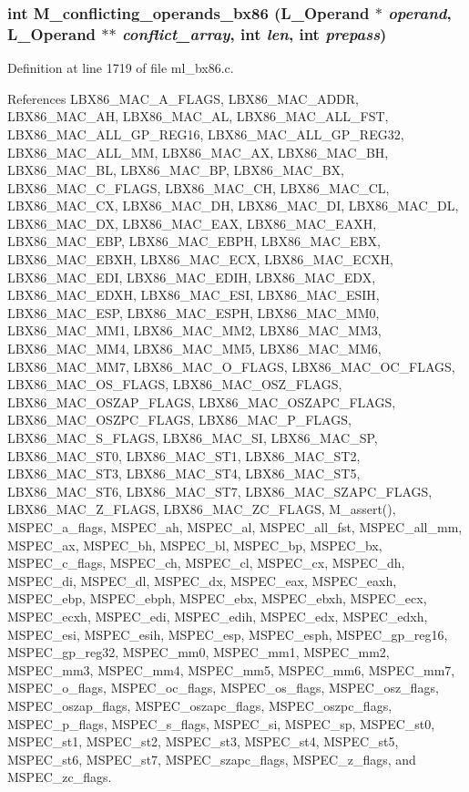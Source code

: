 \subsubsection{\setlength{\rightskip}{0pt plus 5cm}int M\_\-conflicting\_\-operands\_\-bx86 (L\_\-Operand $\ast$ {\em operand}, L\_\-Operand $\ast$$\ast$ {\em conflict\_\-array}, int {\em len}, int {\em prepass})}\label{m__bx86_8h_4954ea2e9fd4bad8ff3bb50174c9fd7f}




Definition at line 1719 of file ml\_\-bx86.c.

References LBX86\_\-MAC\_\-A\_\-FLAGS, LBX86\_\-MAC\_\-ADDR, LBX86\_\-MAC\_\-AH, LBX86\_\-MAC\_\-AL, LBX86\_\-MAC\_\-ALL\_\-FST, LBX86\_\-MAC\_\-ALL\_\-GP\_\-REG16, LBX86\_\-MAC\_\-ALL\_\-GP\_\-REG32, LBX86\_\-MAC\_\-ALL\_\-MM, LBX86\_\-MAC\_\-AX, LBX86\_\-MAC\_\-BH, LBX86\_\-MAC\_\-BL, LBX86\_\-MAC\_\-BP, LBX86\_\-MAC\_\-BX, LBX86\_\-MAC\_\-C\_\-FLAGS, LBX86\_\-MAC\_\-CH, LBX86\_\-MAC\_\-CL, LBX86\_\-MAC\_\-CX, LBX86\_\-MAC\_\-DH, LBX86\_\-MAC\_\-DI, LBX86\_\-MAC\_\-DL, LBX86\_\-MAC\_\-DX, LBX86\_\-MAC\_\-EAX, LBX86\_\-MAC\_\-EAXH, LBX86\_\-MAC\_\-EBP, LBX86\_\-MAC\_\-EBPH, LBX86\_\-MAC\_\-EBX, LBX86\_\-MAC\_\-EBXH, LBX86\_\-MAC\_\-ECX, LBX86\_\-MAC\_\-ECXH, LBX86\_\-MAC\_\-EDI, LBX86\_\-MAC\_\-EDIH, LBX86\_\-MAC\_\-EDX, LBX86\_\-MAC\_\-EDXH, LBX86\_\-MAC\_\-ESI, LBX86\_\-MAC\_\-ESIH, LBX86\_\-MAC\_\-ESP, LBX86\_\-MAC\_\-ESPH, LBX86\_\-MAC\_\-MM0, LBX86\_\-MAC\_\-MM1, LBX86\_\-MAC\_\-MM2, LBX86\_\-MAC\_\-MM3, LBX86\_\-MAC\_\-MM4, LBX86\_\-MAC\_\-MM5, LBX86\_\-MAC\_\-MM6, LBX86\_\-MAC\_\-MM7, LBX86\_\-MAC\_\-O\_\-FLAGS, LBX86\_\-MAC\_\-OC\_\-FLAGS, LBX86\_\-MAC\_\-OS\_\-FLAGS, LBX86\_\-MAC\_\-OSZ\_\-FLAGS, LBX86\_\-MAC\_\-OSZAP\_\-FLAGS, LBX86\_\-MAC\_\-OSZAPC\_\-FLAGS, LBX86\_\-MAC\_\-OSZPC\_\-FLAGS, LBX86\_\-MAC\_\-P\_\-FLAGS, LBX86\_\-MAC\_\-S\_\-FLAGS, LBX86\_\-MAC\_\-SI, LBX86\_\-MAC\_\-SP, LBX86\_\-MAC\_\-ST0, LBX86\_\-MAC\_\-ST1, LBX86\_\-MAC\_\-ST2, LBX86\_\-MAC\_\-ST3, LBX86\_\-MAC\_\-ST4, LBX86\_\-MAC\_\-ST5, LBX86\_\-MAC\_\-ST6, LBX86\_\-MAC\_\-ST7, LBX86\_\-MAC\_\-SZAPC\_\-FLAGS, LBX86\_\-MAC\_\-Z\_\-FLAGS, LBX86\_\-MAC\_\-ZC\_\-FLAGS, M\_\-assert(), MSPEC\_\-a\_\-flags, MSPEC\_\-ah, MSPEC\_\-al, MSPEC\_\-all\_\-fst, MSPEC\_\-all\_\-mm, MSPEC\_\-ax, MSPEC\_\-bh, MSPEC\_\-bl, MSPEC\_\-bp, MSPEC\_\-bx, MSPEC\_\-c\_\-flags, MSPEC\_\-ch, MSPEC\_\-cl, MSPEC\_\-cx, MSPEC\_\-dh, MSPEC\_\-di, MSPEC\_\-dl, MSPEC\_\-dx, MSPEC\_\-eax, MSPEC\_\-eaxh, MSPEC\_\-ebp, MSPEC\_\-ebph, MSPEC\_\-ebx, MSPEC\_\-ebxh, MSPEC\_\-ecx, MSPEC\_\-ecxh, MSPEC\_\-edi, MSPEC\_\-edih, MSPEC\_\-edx, MSPEC\_\-edxh, MSPEC\_\-esi, MSPEC\_\-esih, MSPEC\_\-esp, MSPEC\_\-esph, MSPEC\_\-gp\_\-reg16, MSPEC\_\-gp\_\-reg32, MSPEC\_\-mm0, MSPEC\_\-mm1, MSPEC\_\-mm2, MSPEC\_\-mm3, MSPEC\_\-mm4, MSPEC\_\-mm5, MSPEC\_\-mm6, MSPEC\_\-mm7, MSPEC\_\-o\_\-flags, MSPEC\_\-oc\_\-flags, MSPEC\_\-os\_\-flags, MSPEC\_\-osz\_\-flags, MSPEC\_\-oszap\_\-flags, MSPEC\_\-oszapc\_\-flags, MSPEC\_\-oszpc\_\-flags, MSPEC\_\-p\_\-flags, MSPEC\_\-s\_\-flags, MSPEC\_\-si, MSPEC\_\-sp, MSPEC\_\-st0, MSPEC\_\-st1, MSPEC\_\-st2, MSPEC\_\-st3, MSPEC\_\-st4, MSPEC\_\-st5, MSPEC\_\-st6, MSPEC\_\-st7, MSPEC\_\-szapc\_\-flags, MSPEC\_\-z\_\-flags, and MSPEC\_\-zc\_\-flags.

